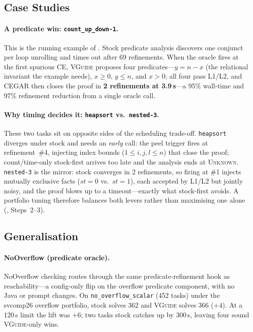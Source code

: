 \documentclass[runningheads]{llncs}
\newcommand{\tool}{\textsc{VGuide}}
\begin{document}
\subsection{Case Studies}
\label{sec:casestudies}

\paragraph{A predicate win: \texttt{count\_up\_down-1}.} This is the running example of
. Stock predicate analysis discovers one conjunct per loop unrolling and times
out after 69 refinements. When the oracle fires at the first spurious CE, \tool{} proposes four predicates---$y=n-x$
(the relational invariant the example needs), $x\ge 0$, $y\le n$, and $x>0$; all four pass
L1/L2, and CEGAR then closes the proof in \textbf{2 refinements at 3.9\,s}---a 95\%
wall-time and 97\% refinement reduction from a single oracle call.

\paragraph{Why timing decides it: \texttt{heapsort} vs.\ \texttt{nested-3}.} These two tasks sit
on opposite sides of the scheduling trade-off. \texttt{heapsort} diverges under stock and needs an
\emph{early} call: the peel trigger fires at refinement~\#4, injecting index bounds
($1\le i,j,l\le n$) that close the proof; count/time-only stock-first arrives too late and the
analysis ends at \textsc{Unknown}. \texttt{nested-3} is the mirror: stock converges in 2
refinements, so firing at \#1 injects mutually exclusive facts ($\mathit{st}=0$ vs.\ $\mathit{st}=1$),
each accepted by L1/L2 but jointly noisy, and the proof blows up to a timeout---exactly what
stock-first avoids. A portfolio tuning therefore balances both levers rather than maximising one
alone (, Steps~2--3).

\subsection{Generalisation}
\label{sec:generalisation}

\paragraph{NoOverflow (predicate oracle).} NoOverflow checking routes through the same
predicate-refinement hook as reachability---a config-only flip on the overflow predicate
component, with no Java or prompt changes. On \texttt{no\_overflow\_scalar} (452 tasks) under
the svcomp26 overflow portfolio, stock solves 362 and \tool{} solves 366 ($+4$). At a 120\,s
limit the lift was $+6$; two tasks stock catches up by 300\,s, leaving four sound
\tool{}-only wins.
\end{document}
